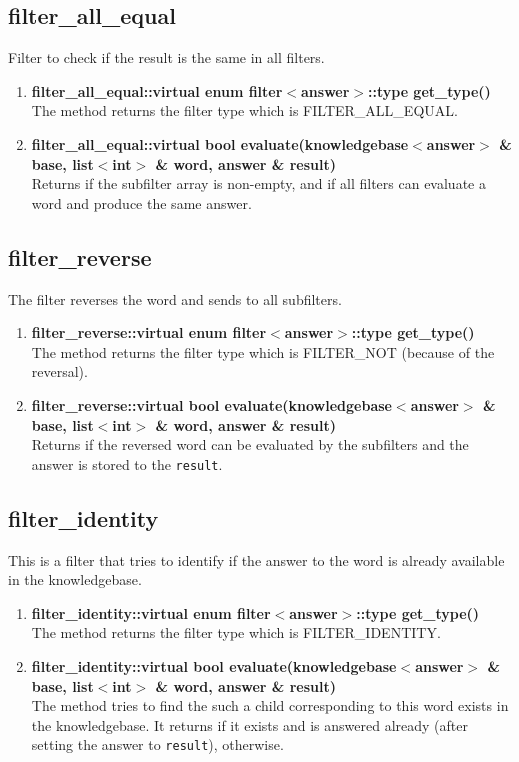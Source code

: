\subsection*{filter\_all\_equal}
Filter to check if the result is the same in all filters.
\begin{enumerate}
 \item \textbf{filter\_all\_equal::virtual enum filter$<$answer$>$::type get\_type()} \\
	The method returns the filter type which is FILTER\_ALL\_EQUAL.
 \item \textbf{filter\_all\_equal::virtual bool evaluate(knowledgebase$<$answer$>$ \& base, list$<$int$>$ \& word, answer \& result)} \\
	Returns \true if the subfilter array is non-empty, and if all filters can evaluate a word and produce the same answer. 
\end{enumerate}

\subsection*{filter\_reverse}
The filter reverses the word and sends to all subfilters.
\begin{enumerate}
 \item \textbf{filter\_reverse::virtual enum filter$<$answer$>$::type get\_type()} \\
	The method returns the filter type which is FILTER\_NOT (because of the reversal).
 \item \textbf{filter\_reverse::virtual bool evaluate(knowledgebase$<$answer$>$ \& base, list$<$int$>$ \& word, answer \& result)} \\
	Returns \true if the reversed word can be evaluated by the subfilters and the answer is stored to the \texttt{result}.
\end{enumerate}

\subsection*{filter\_identity}
This is a filter that tries to identify if the answer to the word is already available in the knowledgebase.
\begin{enumerate}
 \item \textbf{filter\_identity::virtual enum filter$<$answer$>$::type get\_type()} \\
	The method returns the filter type which is FILTER\_IDENTITY.
 \item \textbf{filter\_identity::virtual bool evaluate(knowledgebase$<$answer$>$ \& base, list$<$int$>$ \& word, answer \& result)} \\
	The method tries to find the such a child corresponding to this word exists in the knowledgebase. It returns \true if it exists and is answered already (after setting the answer to \texttt{result}), \false otherwise.
\end{enumerate}

